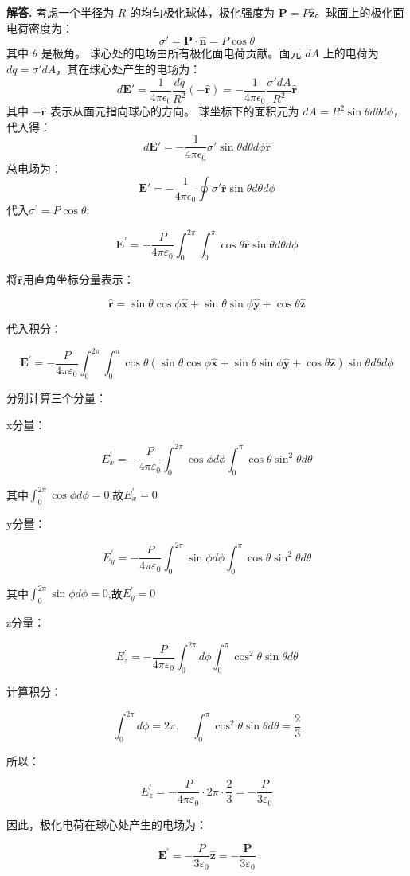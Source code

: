 \documentclass[12pt, a4paper, oneside]{ctexart}
\newenvironment{solution}{\par\noindent\textbf{解答. }}{\par}
\begin{document}
\begin{solution}
考虑一个半径为 $R$ 的均匀极化球体，极化强度为 $\mathbf{P} = P \hat{\mathbf{z}}$。球面上的极化面电荷密度为：
$$\sigma' = \mathbf{P} \cdot \hat{\mathbf{n}} = P \cos \theta$$
其中 $\theta$ 是极角。
球心处的电场由所有极化面电荷贡献。面元 $dA$ 上的电荷为 $dq = \sigma' dA$，其在球心处产生的电场为：
$$
d\mathbf{E'} = \frac{1}{4\pi\epsilon_0} \frac{dq}{R^2} (-\hat{\mathbf{r}}) = -\frac{1}{4\pi\epsilon_0} \frac{\sigma' dA}{R^2} \hat{\mathbf{r}}$$
其中 $-\hat{\mathbf{r}}$ 表示从面元指向球心的方向。
球坐标下的面积元为 $dA = R^2 \sin \theta d\theta d\phi$，代入得：
$$d\mathbf{E'} = -\frac{1}{4\pi\epsilon_0} \sigma' \sin \theta d\theta d\phi \hat{\mathbf{r}}$$
总电场为：
$$
\mathbf{E'} = -\frac{1}{4\pi\epsilon_0} \oint \sigma' \hat{\mathbf{r}} \sin \theta d\theta d\phi$$
代入$\sigma^\prime=P\cos\theta:$

$$\mathbf{E}^{\prime}=-\frac P{4\pi\varepsilon_0}\int_0^{2\pi}\int_0^\pi\cos\theta\hat{\mathbf{r}}\sin\theta d\theta d\phi $$

将$\hat{\mathbf{r}}$用直角坐标分量表示：

$$\hat{\mathbf{r}}=\sin\theta\cos\phi\hat{\mathbf{x}}+\sin\theta\sin\phi\hat{\mathbf{y}}+\cos\theta\hat{\mathbf{z}}$$

代入积分：

$$\mathbf{E}^{\prime}=-\frac P{4\pi\varepsilon_0}\int_0^{2\pi}\int_0^\pi\cos\theta(\sin\theta\cos\phi\hat{\mathbf{x}}+\sin\theta\sin\phi\hat{\mathbf{y}}+\cos\theta\hat{\mathbf{z}})\sin\theta d\theta d\phi $$

分别计算三个分量：

x分量：

$$E_x^{\prime}=-\frac P{4\pi\varepsilon_0}\int_0^{2\pi}\cos\phi d\phi\int_0^\pi\cos\theta\sin^2\theta d\theta $$

其中$\int_0^{2\pi}\cos\phi d\phi=0$,故$E_x^\prime=0$

y分量：

$$E_y^{\prime}=-\frac P{4\pi\varepsilon_0}\int_0^{2\pi}\sin\phi d\phi\int_0^\pi\cos\theta\sin^2\theta d\theta $$

其中$\int_0^{2\pi}\sin\phi d\phi=0$,故$E_y^{\prime}=0$

z分量：

$$E_z^\prime=-\frac P{4\pi\varepsilon_0}\int_0^{2\pi}d\phi\int_0^\pi\cos^2\theta\sin\theta d\theta $$

计算积分：

$$\int_0^{2\pi}d\phi=2\pi,\quad\int_0^{\pi}\cos^2\theta\sin\theta d\theta=\frac23$$

所以：

$$E_z^{\prime}=-\frac P{4\pi\varepsilon_0}\cdot2\pi\cdot\frac23=-\frac P{3\varepsilon_0}$$

因此，极化电荷在球心处产生的电场为：

\[\mathbf{E}^{\prime}=-\frac P{3\varepsilon_0}\hat{\mathbf{z}}=-\frac{\mathbf{P}}{3\varepsilon_0}\]
\end{solution}
\end{document}

